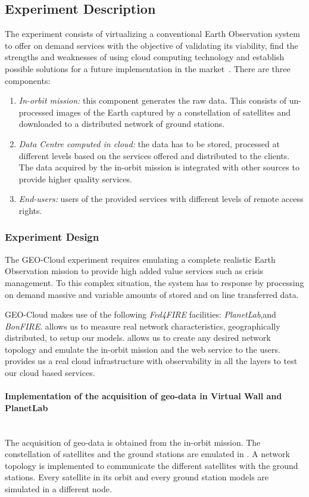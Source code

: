 \subsection{Experiment Description}

The experiment consists of virtualizing a conventional Earth Observation system to offer on
demand services with the objective of validating its viability, find
the strengths and weaknesses of using cloud computing technology and establish
possible solutions for a future implementation in the market~\cite{Becedas2014}. There are three
components:
\begin{enumerate}
\item \emph{In-orbit mission:} this component generates the raw data. This
  consists of un-processed images of the Earth captured by a constellation of
  satellites and downloaded to a distributed network of ground stations.
\item \emph{Data Centre computed in cloud:} the data has to be stored, processed at different levels based on the services offered and distributed to the clients. The data acquired by the in-orbit mission is integrated with other sources to provide higher quality services.
\item \emph{End-users:} users of the provided services with different levels of remote access rights.

\end{enumerate}


\subsubsection{Experiment Design}


The GEO-Cloud experiment requires emulating a complete realistic Earth Observation mission to provide high added value services such as crisis management. To this complex situation, the system has to response by processing on demand massive and variable amounts of stored and on line transferred data.

GEO-Cloud makes use of the following \emph{Fed4FIRE} facilities: \emph{PlanetLab},\vw and
\emph{BonFIRE}. \pl allows us to measure real network characteristics, geographically
distributed, to setup our models. \vw allows us to create any desired network
topology and emulate the in-orbit mission and the web service to the
users. \bonfire provides us a real cloud infrastructure with observability in
all the layers to test our cloud based services.


\paragraph{Implementation of the acquisition of geo-data in Virtual Wall and
  PlanetLab}~\\
The acquisition of geo-data is obtained from the in-orbit mission. The
constellation of satellites and the ground stations are emulated in \vw. A
network topology is implemented to communicate the different satellites with the
ground stations. Every satellite in its orbit and every ground station models
are simulated in a different node.

